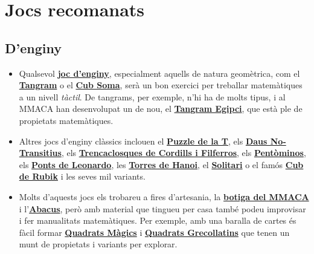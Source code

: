 \documentclass[a4paper, 12pt]{article}
\begin{document}
    \newpage %

    \section*{Jocs recomanats}

        \subsection*{D'enginy}

            \begin{itemize}
                \item Qualsevol \href{http://robspuzzlepage.com/mainmenu.htm}{\textbf{joc d'enginy}}, especialment aquells de natura geomètrica, com el \href{https://ca.wikipedia.org/wiki/Tangram}{\textbf{Tangram}} o el \href{https://ca.wikipedia.org/wiki/Cub_Soma}{\textbf{Cub Soma}}, serà un bon exercici per treballar matemàtiques a un nivell \emph{tàctil}. De tangrams, per exemple, n'hi ha de molts tipus, i al MMACA han desenvolupat un de nou, el \href{https://github.com/CarlosLunaMota/The-Egyptian-Tangram}{\textbf{Tangram Egipci}}, que està ple de propietats matemàtiques.
                \item Altres jocs d'enginy clàssics inclouen el \href{https://en.wikipedia.org/wiki/T_puzzle}{\textbf{Puzzle de la T}}, els \href{https://en.wikipedia.org/wiki/Nontransitive_dice}{\textbf{Daus No-Transitius}}, els \href{https://en.wikipedia.org/wiki/Disentanglement_puzzle}{\textbf{Trencaclosques de Cordills i Filferros}}, els \href{https://ca.wikipedia.org/wiki/Pent\%C3\%B2mino}{\textbf{Pentòminos}}, els \href{https://mmaca.cat/visitans/grups-escolars/les-cupules-de-leonardo/}{\textbf{Ponts de Leonardo}}, les \href{https://ca.wikipedia.org/wiki/Torres_de_Hanoi}{\textbf{Torres de Hanoi}}, el \href{https://ca.wikipedia.org/wiki/Solitari_(joc_de_tauler)}{\textbf{Solitari}} o el famós \href{https://ca.wikipedia.org/wiki/Cub_de_Rubik}{\textbf{Cub de Rubik}} i les seves mil variants.
                \item Molts d'aquests jocs els trobareu a fires d'artesania, la \href{https://mmaca.cat/botiga/}{\textbf{botiga del MMACA}} i l'\href{https://www.abacus.coop/ca/home}{\textbf{Abacus}}, però amb material que tingueu per casa també podeu improvisar i fer manualitats matemàtiques. Per exemple, amb una baralla de cartes és fàcil formar \href{https://ca.wikipedia.org/wiki/Quadrat_m\%C3\%A0gic}{\textbf{Quadrats Màgics}} i \href{https://ca.wikipedia.org/wiki/Quadrat_grecollat\%C3\%AD}{\textbf{Quadrats Grecollatins}} que tenen un munt de propietats i variants per explorar.
            \end{itemize}
\end{document}
